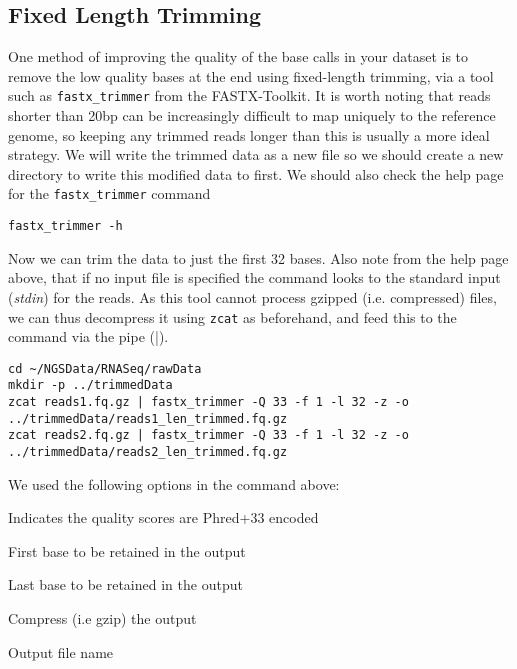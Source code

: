 \subsection{Fixed Length Trimming}
One method of improving the quality of the base calls in your dataset is to remove the low quality bases at the end using fixed-length trimming, via a tool such as \texttt{fastx_trimmer} from the FASTX-Toolkit.
It is worth noting that reads shorter than 20bp can be increasingly difficult to map uniquely to the reference genome, so keeping any trimmed reads longer than this is usually a more ideal strategy.
We will write the trimmed data as a new file so we should create a new directory to write this modified data to first.
We should also check the help page for the \texttt{fastx_trimmer} command
\begin{steps}
\begin{lstlisting}
fastx_trimmer -h
\end{lstlisting}
\end{steps}

\begin{steps}
Now we can trim the data to just the first 32 bases.
Also note from the help page above, that if no input file is specified the command looks to the standard input (\textit{stdin}) for the reads.
As this tool cannot process gzipped (i.e. compressed) files, we can thus decompress it using \texttt{zcat} as beforehand, and feed this to the command via the pipe (|).
\end{steps}

\begin{lstlisting}
cd ~/NGSData/RNASeq/rawData
mkdir -p ../trimmedData
zcat reads1.fq.gz | fastx_trimmer -Q 33 -f 1 -l 32 -z -o ../trimmedData/reads1_len_trimmed.fq.gz
zcat reads2.fq.gz | fastx_trimmer -Q 33 -f 1 -l 32 -z -o ../trimmedData/reads2_len_trimmed.fq.gz
\end{lstlisting}

\begin{note}
We used the following options in the command above:
\begin{description}[style=multiline,labelindent=0cm,align=right,leftmargin=0.8\descriptionlabelspace,rightmargin=1.5cm,font=\ttfamily]
\item[-Q 33] Indicates the quality scores are Phred+33 encoded
\item[-f 1] First base to be retained in the output
\item[-l 32] Last base to be retained in the output
\item[-z] Compress (i.e gzip) the output
\item[-o] Output file name
\end{description}
\end{note}

